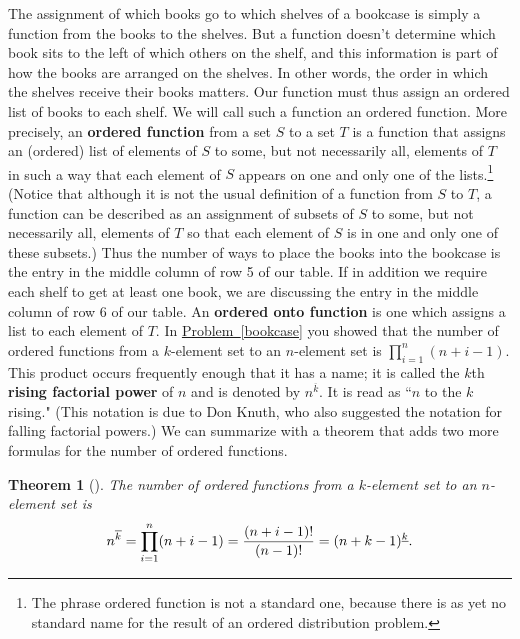 \documentclass[10pt,]{book}
\newcommand{\terminology}[1]{\textbf{#1}}
\theoremstyle{plain}
\newtheorem{theorem}{Theorem}[section]
\theoremstyle{definition}
\numberwithin{equation}{chapter}
\begin{document}
The assignment of which books go to which shelves of a bookcase is simply a function from the books to the shelves. But a function doesn't determine which book sits to the left of which others on the shelf, and this information is part of how the books are arranged on the shelves. In other words, the order in which the shelves receive their books matters.  Our function must thus assign an ordered list of books to each shelf. We will call such a function an ordered function. More precisely, an \terminology{ordered function} from a set \(S\) to a set \(T\) is a function that assigns an (ordered) list of elements of \(S\) to some, but not necessarily all, elements of \(T\) in such a way that each element of \(S\) appears on one and only one of the lists.\footnote{The phrase ordered function is not a standard one, because there is as yet no standard name for the result of an ordered distribution problem.\label{fn-4}} (Notice that although it is not the usual definition of a function from \(S\) to \(T\), a function can be described as an assignment of subsets of \(S\) to some, but not necessarily all, elements of \(T\) so that each element of \(S\) is in one and only one of these subsets.) Thus the number of ways to place the books into the bookcase is the entry in the middle column of row 5 of our table. If in addition we require each shelf to get at least one book, we are discussing the entry in the middle column of row 6 of our table. An \terminology{ordered onto function} is one which assigns a list to each element of \(T\). In \hyperref[bookcase]{Problem~\ref{bookcase}} you showed that the number of ordered functions from a \(k\)-element set to an \(n\)-element set is \(\displaystyle \prod_{i=1}^n (n+i-1)\). This product occurs frequently enough that it has a name; it is called the \(k\)\/th \terminology{rising factorial power} of \(n\) and is denoted by \(n^{\overline{k}}\). It is read as ``\(n\) to the \(k\) rising." (This notation is due to Don Knuth, who also suggested the notation for falling factorial powers.) We can summarize with a theorem that adds two more formulas for the number of ordered functions.%
\begin{theorem}[{}]\label{theorem-5}
The number of ordered functions from a \(k\)-element set to an \(n\)-element set is%
\begin{equation*}
n^{\overline{k}}=\prod_{i=1}^n (n+i-1) = {(n+i-1)!\over (n-1)!} =
(n+k-1)^{\underline{k}}.
\end{equation*}
%
\end{theorem}
\typeout{************************************************}
\typeout{************************************************}
\end{document}
